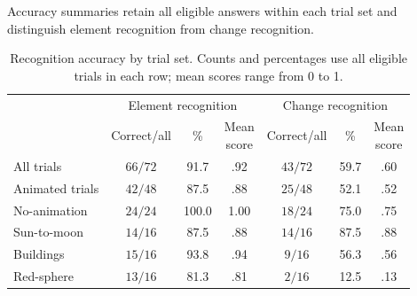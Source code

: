 \documentclass[
english,                 %
bibtex,                  %
includeExtraAbstracts, %
]{kththesis}
\newenvironment{evidenceblock}{\par\addvspace{6pt}\noindent\begin{minipage}{\linewidth}}{\end{minipage}\par\addvspace{6pt}}
\numberwithin{listing}{chapter}
\begin{document}
\begin{evidenceblock}
\normalsize
Accuracy summaries retain all eligible answers within each trial set and distinguish element recognition from change recognition.

\begin{table}[H]
\centering
\footnotesize
\caption[Recognition accuracy by trial set]{Recognition accuracy by trial set. Counts and percentages use all eligible trials in each row; mean scores range from 0 to 1.}
\label{tab:rq2-condition-accuracy}
\setlength{\tabcolsep}{3pt}
\renewcommand{\arraystretch}{1.18}
\begin{tabularx}{\textwidth}{@{}>{\raggedright\arraybackslash}X c c c c c c@{}}
\toprule
& \multicolumn{3}{c}{Element recognition} & \multicolumn{3}{c}{Change recognition} \\
\cmidrule(lr){2-4}\cmidrule(lr){5-7}
\multicolumn{1}{c}{Scope} & Correct/all & \% & \shortstack{Mean\\score} & Correct/all & \% & \shortstack{Mean\\score} \\
\midrule
All trials & $66/72$ & 91.7 & .92 & $43/72$ & 59.7 & .60 \\
Animated trials & $42/48$ & 87.5 & .88 & $25/48$ & 52.1 & .52 \\
No-animation & $24/24$ & 100.0 & 1.00 & $18/24$ & 75.0 & .75 \\
Sun-to-moon & $14/16$ & 87.5 & .88 & $14/16$ & 87.5 & .88 \\
Buildings & $15/16$ & 93.8 & .94 & $9/16$ & 56.3 & .56 \\
Red-sphere & $13/16$ & 81.3 & .81 & $2/16$ & 12.5 & .13 \\
\bottomrule
\end{tabularx}

\end{table}
\end{evidenceblock}
\end{document}
